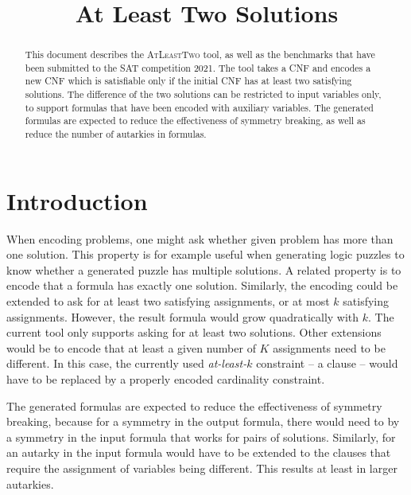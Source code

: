 \documentclass[conference]{IEEEtran}
\begin{document}
	
\title{At Least Two Solutions}

\author{
}

\maketitle

\def\coprocessor{\textsc{Coprocessor}\xspace}
\def\ALT{\textsc{AtLeastTwo}\xspace}

\begin{abstract}
This document describes the \ALT tool, as well as the benchmarks that have been submitted to the SAT competition 2021.
The tool takes a CNF and encodes a new CNF which is satisfiable only if the initial CNF has at least two satisfying solutions. The difference of the two solutions can be restricted to input variables only, to support formulas that have been encoded with auxiliary variables.
The generated formulas are expected to reduce the effectiveness of symmetry breaking, as well as reduce the number of autarkies in formulas.
\end{abstract}

\section{Introduction}

When encoding problems, one might ask whether given problem has more than one solution.
This property is for example useful when generating logic puzzles to know whether a generated puzzle has multiple solutions.
A related property is to encode that a formula has exactly one solution.
Similarly, the encoding could be extended to ask for at least two satisfying assignments, or at most $k$ satisfying assignments.
However, the result formula would grow quadratically with $k$.
The current tool only supports asking for at least two solutions.
Other extensions would be to encode that at least a given number of $K$ assignments need to be different.
In this case, the currently used \emph{at-least-$k$} constraint -- a clause -- would have to be replaced by a properly encoded cardinality constraint.

The generated formulas are expected to reduce the effectiveness of symmetry breaking, because for a symmetry in the output formula, there would need to by a symmetry in the input formula that works for pairs of solutions.
Similarly, for an autarky in the input formula would have to be extended to the clauses that require the assignment of variables being different.
This results at least in larger autarkies.
\end{document}
